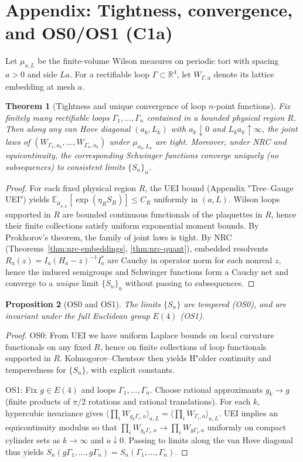 \documentclass[11pt]{amsart}
\theoremstyle{plain}
\newtheorem{theorem}{Theorem}[section]
\newtheorem{proposition}[theorem]{Proposition}
\theoremstyle{definition}
\theoremstyle{remark}
\begin{document}
\section{Appendix: Tightness, convergence, and OS0/OS1 (C1a)}
Let $\mu_{a,L}$ be the finite-volume Wilson measures on periodic tori with spacing $a>0$ and side $L a$. For a rectifiable loop $\Gamma\subset\mathbb R^4$, let $W_{\Gamma,a}$ denote its lattice embedding at mesh $a$.
\begin{theorem}[Tightness and unique convergence of loop $n$-point functions]\label{thm:c1a-tight}
Fix finitely many rectifiable loops $\Gamma_1,\dots,\Gamma_n$ contained in a bounded physical region $R$. Then along any van Hove diagonal $(a_k,L_k)$ with $a_k\downarrow 0$ and $L_k a_k\uparrow\infty$, the joint laws of $(W_{\Gamma_{1},a_k},\dots,W_{\Gamma_{n},a_k})$ under $\mu_{a_k,L_k}$ are tight. Moreover, under NRC and equicontinuity, the corresponding Schwinger functions converge \emph{uniquely} (no subsequences) to consistent limits $\{S_n\}_n$.
\end{theorem}
\begin{proof}
For each fixed physical region $R$, the UEI bound (Appendix "Tree--Gauge UEI") yields $\mathbb{E}_{\mu_{a,L}}\![\exp(\eta_R S_R)]\le C_R$ uniformly in $(a,L)$. Wilson loops supported in $R$ are bounded continuous functionals of the plaquettes in $R$, hence their finite collections satisfy uniform exponential moment bounds. By Prokhorov's theorem, the family of joint laws is tight. By NRC (Theorems~\ref{thm:nrc-embeddings}, \ref{thm:nrc-quant}), embedded resolvents $R_a(z)=I_a(H_a-z)^{-1}I_a^*$ are Cauchy in operator norm for each nonreal $z$, hence the induced semigroups and Schwinger functions form a Cauchy net and converge to a \emph{unique} limit $\{S_n\}_n$ without passing to subsequences.
\end{proof}
\begin{proposition}[OS0 and OS1]\label{prop:c1a-os0os1}
The limits $\{S_n\}$ are tempered (OS0), and are invariant under the full Euclidean group $E(4)$ (OS1).
\end{proposition}

\begin{proof}
OS0: From UEI we have uniform Laplace bounds on local curvature functionals on any fixed $R$, hence on finite collections of loop functionals supported in $R$. Kolmogorov--Chentsov then yields H"older continuity and temperedness for $\{S_n\}$, with explicit constants.

OS1: Fix $g\in E(4)$ and loops $\Gamma_1,\dots,\Gamma_n$. Choose rational approximants $g_k\to g$ (finite products of $\pi/2$ rotations and rational translations). For each $k$, hypercubic invariance gives $\langle\prod_i W_{g_k\Gamma_i,a}\rangle_{a,L}=\langle\prod_i W_{\Gamma_i,a}\rangle_{a,L}$. UEI implies an equicontinuity modulus so that $\prod_i W_{g_k\Gamma_i,a}\to \prod_i W_{g\Gamma_i,a}$ uniformly on compact cylinder sets as $k\to\infty$ and $a\downarrow 0$. Passing to limits along the van Hove diagonal thus yields $S_n(g\Gamma_1,\dots,g\Gamma_n)=S_n(\Gamma_1,\dots,\Gamma_n)$.
\end{proof}
\end{document}
